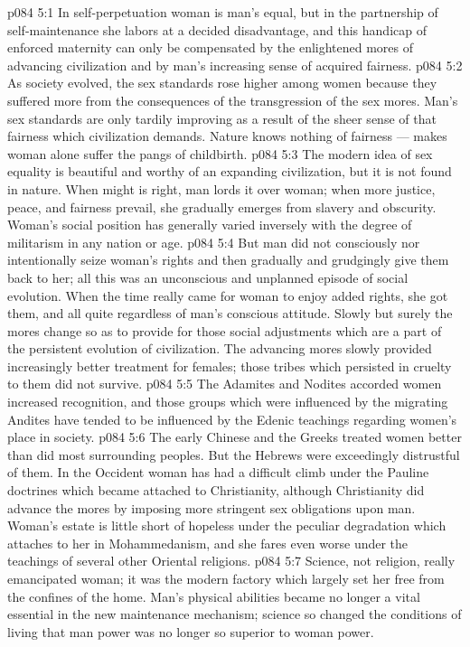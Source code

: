 \vs p084 5:1 In self\hyp{}perpetuation woman is man’s equal, but in the partnership of self\hyp{}maintenance she labors at a decided disadvantage, and this handicap of enforced maternity can only be compensated by the enlightened mores of advancing civilization and by man’s increasing sense of acquired fairness.
\vs p084 5:2 As society evolved, the sex standards rose higher among women because they suffered more from the consequences of the transgression of the sex mores. Man’s sex standards are only tardily improving as a result of the sheer sense of that fairness which civilization demands. Nature knows nothing of fairness --- makes woman alone suffer the pangs of childbirth.
\vs p084 5:3 The modern idea of sex equality is beautiful and worthy of an expanding civilization, but it is not found in nature. When might is right, man lords it over woman; when more justice, peace, and fairness prevail, she gradually emerges from slavery and obscurity. Woman’s social position has generally varied inversely with the degree of militarism in any nation or age.
\vs p084 5:4 But man did not consciously nor intentionally seize woman’s rights and then gradually and grudgingly give them back to her; all this was an unconscious and unplanned episode of social evolution. When the time really came for woman to enjoy added rights, she got them, and all quite regardless of man’s conscious attitude. Slowly but surely the mores change so as to provide for those social adjustments which are a part of the persistent evolution of civilization. The advancing mores slowly provided increasingly better treatment for females; those tribes which persisted in cruelty to them did not survive.
\vs p084 5:5 \pc The Adamites and Nodites accorded women increased recognition, and those groups which were influenced by the migrating Andites have tended to be influenced by the Edenic teachings regarding women’s place in society.
\vs p084 5:6 The early Chinese and the Greeks treated women better than did most surrounding peoples. But the Hebrews were exceedingly distrustful of them. In the Occident woman has had a difficult climb under the Pauline doctrines which became attached to Christianity, although Christianity did advance the mores by imposing more stringent sex obligations upon man. Woman’s estate is little short of hopeless under the peculiar degradation which attaches to her in Mohammedanism, and she fares even worse under the teachings of several other Oriental religions.
\vs p084 5:7 \pc Science, not religion, really emancipated woman; it was the modern factory which largely set her free from the confines of the home. Man’s physical abilities became no longer a vital essential in the new maintenance mechanism; science so changed the conditions of living that man power was no longer so superior to woman power.
